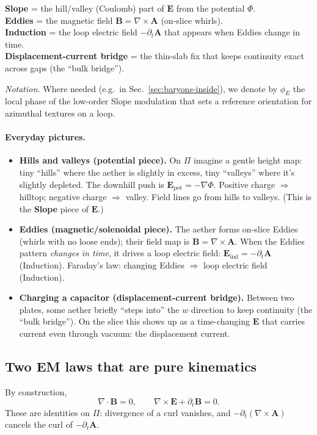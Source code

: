 \begin{tcolorbox}[title=Plain-language map]
\textbf{Slope} = the hill/valley (Coulomb) part of $\mathbf E$ from the potential $\Phi$.\\
\textbf{Eddies} = the magnetic field $\mathbf B=\nabla\times\mathbf A$ (on-slice whirls).\\
\textbf{Induction} = the loop electric field $-\partial_t\mathbf A$ that appears when Eddies change in time.\\
\textbf{Displacement-current bridge} = the thin-slab fix that keeps continuity exact across gaps (the ``bulk bridge'').
\end{tcolorbox}

\noindent\emph{Notation.} Where needed (e.g.\ in Sec.~\ref{sec:baryons-inside}), we denote by $\phi_E$ the local phase of the low-order Slope modulation that sets a reference orientation for azimuthal textures on a loop.

\paragraph{Everyday pictures.}
\begin{itemize}
  \item \textbf{Hills and valleys (potential piece).} On $\Pi$ imagine a gentle height map: tiny ``hills'' where the aether is slightly in excess, tiny ``valleys'' where it's slightly depleted. The downhill push is $\mathbf E_{\text{pot}}=-\nabla\Phi$. Positive charge $\Rightarrow$ hilltop; negative charge $\Rightarrow$ valley. Field lines go from hills to valleys. (This is the \textbf{Slope} piece of $\mathbf E$.)
  \item \textbf{Eddies (magnetic/solenoidal piece).} The aether forms on-slice Eddies (whirls with no loose ends); their field map is $\mathbf B=\nabla\times\mathbf A$. When the Eddies pattern \emph{changes in time}, it drives a loop electric field: $\mathbf E_{\text{ind}}=-\partial_t\mathbf A$ (Induction). Faraday's law: changing Eddies $\Rightarrow$ loop electric field (Induction).
  \item \textbf{Charging a capacitor (displacement-current bridge).} Between two plates, some aether briefly ``steps into'' the $w$ direction to keep continuity (the ``bulk bridge''). On the slice this shows up as a time-changing $\mathbf E$ that carries current even through vacuum: the displacement current.
\end{itemize}

\subsection{Two EM laws that are pure kinematics}
By construction,
\begin{equation}
\nabla\!\cdot\!\mathbf B = 0,
\qquad
\nabla\times\mathbf E + \partial_t \mathbf B = 0.
\label{eq:homogeneous}
\end{equation}
These are identities on $\Pi$: divergence of a curl vanishes, and $-\partial_t(\nabla\times\mathbf A)$ cancels the curl of $-\partial_t\mathbf A$.

